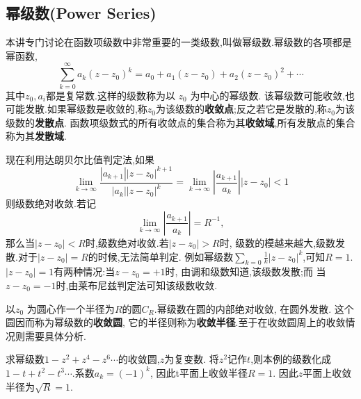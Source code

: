 \subsection{幂级数(Power Series)}
本讲专门讨论在函数项级数中非常重要的一类级数,叫做幂级数.幂级数的各项都是幂函数,
\begin{equation}
    \sum_{k=0}^{\infty} a_k\left(z-z_0\right)^k=a_0+a_1\left(z-z_0\right)+a_2\left(z-z_0\right)^2+\cdots
\end{equation}
其中$z_0, a_i$都是复常数.这样的级数称为以 $z_0$ 为中心的幂级数.
该幂级数可能收敛,也可能发散.如果幂级数是收敛的,称$z_0$为该级数的\textbf{收敛点};反之若它是发散的,称$z_0$为该级数的\textbf{发散点}.
函数项级数式的所有收敛点的集合称为其\textbf{收敛域},所有发散点的集合称为其\textbf{发散域}.

现在利用达朗贝尔比值判定法,如果
\begin{equation}
    \lim _{k \rightarrow \infty} \frac{\left|a_{k+1}\right|\left|z-z_0\right|^{k+1}}{\left|a_k\right|\left|z-z_0\right|^k}
    =\lim _{k \rightarrow \infty}\left|\frac{a_{k+1}}{a_k}\right|\left|z-z_0\right|<1
\end{equation}
则级数绝对收敛.若记
\begin{equation}
    \lim_{k \rightarrow \infty} \left|\frac{a_{k+1}}{a_k}\right| = R^{-1},
\end{equation}
那么当$|z-z_0| < R$时,级数绝对收敛.若$|z-z_0| > R$时, 级数的模越来越大,级数发散.对于$|z-z_0| = R$的时候,无法简单判定.
例如幂级数$\sum_{k=0} \frac{1}{k} |z-z_0|^k$,可知$R=1$.$|z-z_0|=1$有两种情况:当$z-z_0 = +1$时, 由调和级数知道,该级数发散;而
当$z-z_0 = -1$时,由莱布尼兹判定法可知该级数收敛.

以$z_0$ 为圆心作一个半径为$R$的圆$C_R$.幂级数在圆的内部绝对收敛, 在圆外发散. 这个圆因而称为幂级数的\textbf{收敛圆}, 
它的半径则称为\textbf{收敛半径}.至于在收敛圆周上的收敛情况则需要具体分析.

\begin{examplebox}{求幂级数$1 - z^2 + z^4 - z^6\cdots$的收敛圆,$z$为复变数.}
    将$z^2$记作$t$,则本例的级数化成$1-t + t^2 - t^3\cdots$.系数$a_k =(-1)^k$, 因此t平面上收敛半径$R=1$. 
    因此$z$平面上收敛半径为$\sqrt{R}=1$.
\end{examplebox}

